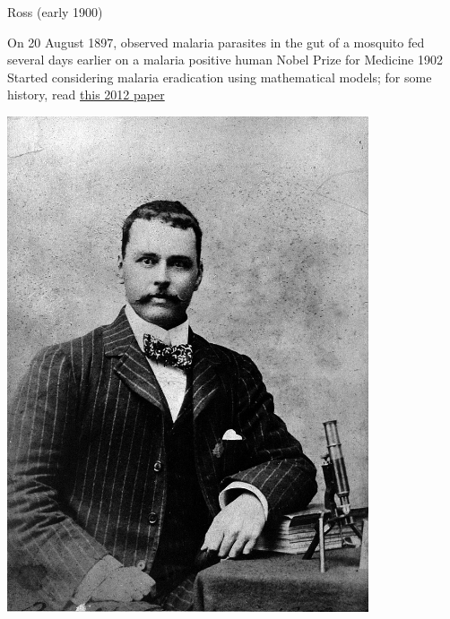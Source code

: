 \documentclass[aspectratio=169]{beamer}\usepackage[]{graphicx}\usepackage[]{xcolor}
\begin{document}
\begin{frame}{Ross (early 1900)}
\begin{minipage}{0.6\textwidth}
\bbullet On 20 August 1897, observed malaria parasites in the gut of a mosquito fed several days earlier on a malaria positive human
\vskip1cm
\bbullet Nobel Prize for Medicine 1902
\vskip1cm
\bbullet Started considering malaria eradication using mathematical models; for some history, read \href{https://www.ncbi.nlm.nih.gov/pmc/articles/PMC3320609/pdf/ppat.1002588.pdf}{this 2012 paper}
\end{minipage}\quad
\begin{minipage}{0.37\textwidth}
    \includegraphics[width=0.8\textwidth]{FIGS/RonaldRoss_WellcomeCollection.jpg}
\end{minipage}
\end{frame}
\end{document}
